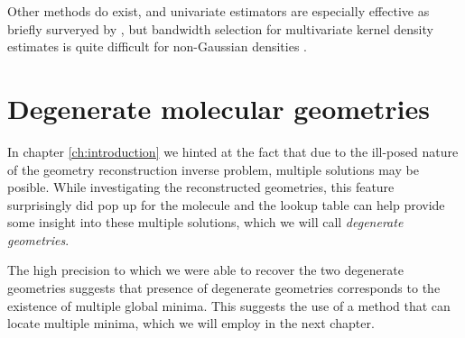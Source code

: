 Other methods do exist, and univariate estimators are especially effective as briefly surveryed by \citet{Jones96}, but bandwidth selection for multivariate kernel density estimates is quite difficult for non-Gaussian densities \citep[\S 6.5.2]{Scott15}.

\section{Degenerate molecular geometries} \label{sec:degenerateGeometries}
In chapter \ref{ch:introduction} we hinted at the fact that due to the ill-posed nature of the geometry reconstruction inverse problem, multiple solutions may be posible. While investigating the reconstructed geometries, this feature surprisingly did pop up for the  molecule and the lookup table can help provide some insight into these multiple solutions, which we will call \emph{degenerate geometries}.

The high precision to which we were able to recover the two degenerate geometries suggests that presence of degenerate geometries corresponds to the existence of multiple global minima. This suggests the use of a method that can locate multiple minima, which we will employ in the next chapter.


